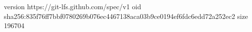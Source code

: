 version https://git-lfs.github.com/spec/v1
oid sha256:835f76ff7bbf0780269b076ec4467138aca03b9ce0194ef6fdc6edd72a252ec2
size 196704
